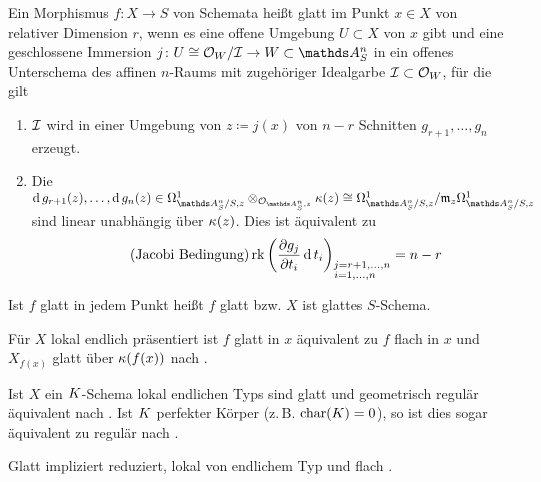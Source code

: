 \documentclass[german]{scrreprt}
\begin{document}
\begin{Definition}
  Ein Morphismus $f\colon X\to S$ von Schemata heißt glatt im Punkt
  $x\in X$ von relativer Dimension $r$, wenn es eine offene Umgebung
  $U\subset X$ von $x$ gibt und eine geschlossene Immersion $j\colon
  U\cong\O_W/\I\to W\subset\A_S^n$ in ein offenes Unterschema des affinen
  $n$-Raums mit zugehöriger Idealgarbe $\mathcal{I}\subset\mathcal{O}_W$, für die
  gilt
  \begin{enumerate}[label=(\alph*)]
  \item $\mathcal{I}$ wird in einer Umgebung von $z\coloneqq j(x)$ von $n-r$ Schnitten
    $g_{r+1},\dotsc,g_{n}$ erzeugt.
  \item Die $\d g_{r+1}(z),\dotsc,\d g_{n}(z)\in 
    \Om{\A_S^n/S,z} \otimes_{\O_{\A_S^n,z}} \k(z)
    \cong \Om{\A_S^n/S,z}/\m_z\Om{\A_S^n/S,z}$ 
    sind linear unabhängig über $\kappa(z)$.
    Dies ist äquivalent zu
    \begin{gather*}\tag{Jacobi Bedingung}
      \operatorname{rk}\left(
        \frac{\partial g_j}{\partial t_i}\operatorname{d} t_i 
      \right)_{\substack{j=r+1,\dotsc,n\\i=1,\dotsc,n\phantom{+1}}}
      = n-r
    \end{gather*}
  \end{enumerate}
  Ist $f$ glatt in jedem Punkt heißt $f$ glatt bzw. $X$ ist glattes
  $S$-Schema.  

  Für $X$ lokal endlich präsentiert ist $f$ glatt in $x$ äquivalent zu
  $f$ flach in $x$ und $X_{f(x)}$ glatt über $\kappa(f(x))$ nach
  \cite[8.5, Proposition 17]{bosch}.

  Ist $X$ ein $K$-Schema lokal endlichen Typs sind glatt und
  geometrisch regulär äquivalent nach \cite[Corollary 6.32]{wedhorn}.
  Ist $K$ perfekter Körper (z.\,B. $\operatorname{char}(K)=0$), so ist dies sogar
  äquivalent zu regulär nach \cite[Remark 6.33]{wedhorn}.

  \begin{Bemerkung}\label{thm:implikationenglatt}
    Glatt impliziert reduziert, lokal von endlichem Typ und flach
    \cite[für flach s.][Theorem 14.22]{wedhorn}.
  \end{Bemerkung}
\end{Definition}
\end{document}

